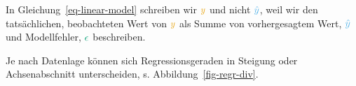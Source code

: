 \documentclass[
  letterpaper,
  twoside,
  open=any]{scrbook}
\theoremstyle{definition}
\theoremstyle{definition}
\theoremstyle{definition}
\theoremstyle{remark}
\begin{document}
In Gleichung~\ref{eq-linear-model} schreiben wir \(\color{ycol}{y}\) und
nicht \(\color{modelcol}{\hat{y}}\), weil wir den tatsächlichen,
beobachteten Wert von \(\color{ycol}{y}\) als Summe von vorhergesagtem
Wert, \(\color{modelcol}{\hat{y}}\) und Modellfehler,
\(\color{errorcol}{\epsilon}\) beschreiben.

Je nach Datenlage können sich Regressionsgeraden in Steigung oder
Achsenabschnitt unterscheiden, s. Abbildung~\ref{fig-regr-div}.

\begin{figure}

\begin{minipage}{0.50\linewidth}



\end{minipage}%
%
\begin{minipage}{0.50\linewidth}

\end{minipage}
\end{figure}
\end{document}
